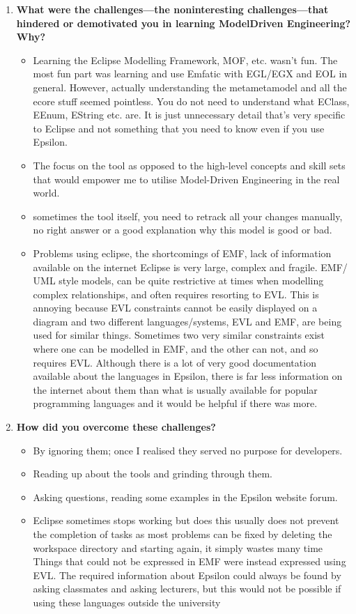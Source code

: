 \documentclass[12pt, a4paper]{report} \usepackage[titletoc]{appendix}
\begin{document}
\begin{appendices}
\begin{enumerate}
\item \textbf{ What were the challenges---the non­interesting challenges---that hindered or demotivated you in learning Model­Driven Engineering? Why?}
\begin{itemize}
\item Learning the Eclipse Modelling Framework, MOF, etc. wasn't fun. The most fun part was learning and use Emfatic with EGL/EGX and EOL in general. However, actually understanding the meta­metamodel and all the ecore stuff seemed pointless. You do not need to understand what EClass, EEnum, EString etc. are. It is just unnecessary detail that's very specific to
Eclipse and not something that you need to know even if you use Epsilon.
\item The focus on the tool as opposed to the high-level concepts and skill sets that would empower me to utilise Model-Driven Engineering in the real world.
\item sometimes the tool itself, you need to re­track all your changes manually, no right answer or a good explanation why this model is good or bad.
\item Problems using eclipse, the shortcomings of EMF, lack of information available on the internet Eclipse is very large, complex and fragile. EMF/ UML ­style models, can be quite restrictive at times when modelling complex relationships, and often requires resorting to EVL. This is annoying because EVL constraints cannot be easily displayed on a diagram and two different languages/systems, EVL and EMF, are being used for similar things. Sometimes two very similar constraints exist where one can be modelled in EMF, and the other can not, and so requires EVL. Although there is a lot of very good documentation available about the languages in Epsilon, there is far less information on the internet about them than what is usually available for popular programming languages and it would be helpful if there was more.
\end{itemize}

\item \textbf{How did you overcome these challenges?}
\begin{itemize}
\item By ignoring them; once I realised they served no purpose for developers.
\item Reading up about the tools and grinding through them.
\item Asking questions, reading some examples in the Epsilon website forum.
\item Eclipse sometimes stops working but does this usually does not prevent the completion of tasks as most problems can be fixed by deleting the workspace directory and starting again, it simply wastes many time Things that could not be expressed in EMF were instead expressed using EVL. The required information about Epsilon could always be found by
asking classmates and asking lecturers, but this would not be possible if using these languages outside the university
\end{itemize}
\end{enumerate}


\end{appendices}
\end{document}
